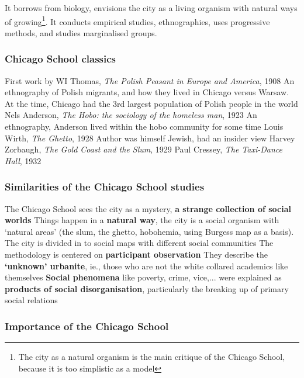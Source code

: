 \documentclass{article}
\begin{document}
It borrows from biology, envisions the city as a living organism with natural ways of growing\footnote{The city as a natural organism is the main critique of the Chicago School, because it is too simplistic as a model}. It conducts empirical studies, ethnographies, uses progressive methods, and studies marginalised groups. 

\subsubsection{Chicago School classics}

\begin{outline}
	\1 First work by WI Thomas, \textit{The Polish Peasant in Europe and America},  1908
		\2 An ethnography of Polish migrants, and how they lived in Chicago versus Warsaw. At the time, Chicago had the 3rd largest population of Polish people in the world
	\1 Nels Anderson, \textit{The Hobo: the sociology of the homeless man}, 1923
		\2 An ethnography, Anderson lived within the hobo community for some time
	\1 Louis Wirth, \textit{The Ghetto}, 1928
		\2 Author was himself Jewish, had an insider view
	\1 Harvey Zorbaugh, \textit{The Gold Coast and the Slum}, 1929
	\1 Paul Cressey, \textit{The Taxi-Dance Hall}, 1932
\end{outline}

\subsubsection{Similarities of the Chicago School studies}

\begin{outline}
	\1 The Chicago School sees the city as a mystery, \textbf{a strange collection of social worlds}
	\1 Things happen in a \textbf{natural way}, the city is a social organism with `natural areas' (the slum, the ghetto, hobohemia, using Burgess map as a basis). The city is divided in to social maps with different social communities
	\1 The methodology is centered on \textbf{participant observation}
	\1 They describe the \textbf{`unknown' urbanite}, ie., those who are not the white collared academics like themselves
	\1 \textbf{Social phenomena} like poverty, crime, vice,... were explained as \textbf{products of social disorganisation}, particularly the breaking up of primary social relations
\end{outline}

\subsubsection{Importance of the Chicago School}
\end{document}
